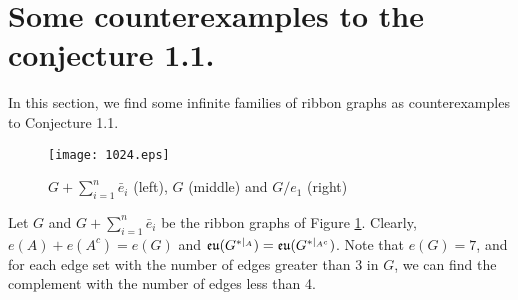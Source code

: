 \section{Some counterexamples to the
conjecture 1.1.}





{  In this section, we find some infinite families of ribbon graphs as  counterexamples to  Conjecture 1.1.  }
\begin{figure}[h]
  \centering
  \texttt{[image: 1024.eps]}
 \caption{$G+\sum ^{n}_{i=1}\bar{e}_{i}$ (left), $G$ (middle) and $G/e_{1}$ (right) }
 \label{m0525}
\end{figure}

  Let $G$ and $G+\sum ^{n}_{i=1}\bar{e}_{i}$ be the ribbon graphs of Figure \ref{m0525}.
 Clearly,  $e(A)+e(A^{c})=e(G)$ and ${\mathfrak{eu}}(G^{*|_{ A}})={\mathfrak{eu}}(G^{*|_{ A^{c}}})$. { Note that $e(G)=7$, and for each edge set with the number of edges greater than 3 in $G$, we can find the complement  with the number of edges less than 4.}

